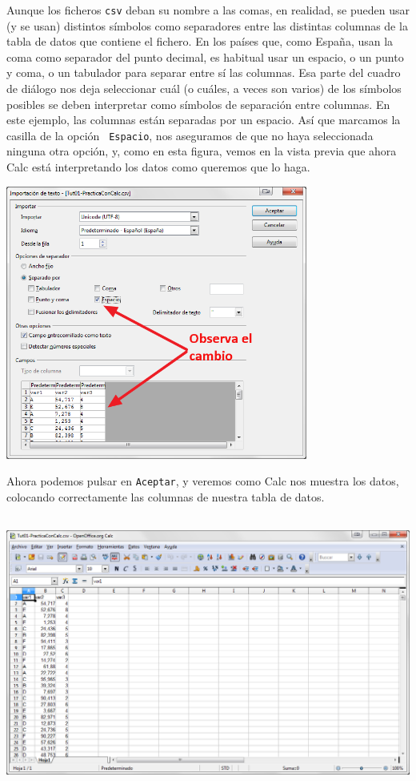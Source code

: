 \documentclass[10pt,a4paper]{article}
\newcounter {cont01}
\begin{document}
Aunque los ficheros {\tt csv} deban su nombre a las comas, en realidad, se pueden usar (y se usan)
distintos símbolos como {\sf separadores} entre las distintas columnas de la tabla de datos que
contiene el fichero. En los países que, como España, usan la coma como separador del punto decimal,
es habitual usar un espacio, o un punto y coma, o un tabulador para separar entre sí las columnas.
Esa parte del cuadro de diálogo nos deja seleccionar cuál (o cuáles, a veces son varios) de los
símbolos posibles se deben interpretar como símbolos de separación entre columnas. En este ejemplo,
las columnas están separadas por un espacio. Así que marcamos la casilla de la opción {\tt
Espacio}, nos aseguramos de que no haya seleccionada ninguna otra opción, y,  como en esta figura,
vemos en la vista previa que ahora Calc está interpretando los datos como queremos que lo haga.
        \begin{center}
        \includegraphics[height=9cm]{../fig/Tut00-Calc-csv-03.png}
        \end{center}
        Ahora podemos pulsar en {\tt Aceptar}, y veremos como Calc nos muestra los datos, colocando correctamente las columnas de nuestra tabla de datos.
        \begin{center}
        \includegraphics[height=9cm]{../fig/Tut00-Calc-csv-04.png}
        \end{center}
\end{document}
